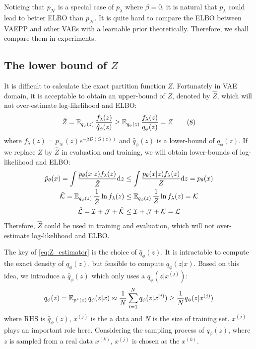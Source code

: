 Noticing that $p_\mathcal{N}$ is a special case of $p_\lambda$ where $\beta = 0$, it is natural that $p_\lambda$ could lead to better ELBO than $p_\mathcal{N}$. It is quite hard to compare the ELBO between VAEPP and other VAEs with a learnable prior theoretically. Therefore, we shall compare them in experiments.  

\subsection{The lower bound of $Z$}\label{subsec:determine_z}

It is difficult to calculate the exact partition function $Z$. Fortunately in VAE domain, it is acceptable to obtain an upper-bound of $Z$, denoted by $\hat{Z}$, which will not over-estimate log-likelihood and ELBO:
\begin{align*}\label{eq:Z_estimator}
    \hat{Z} = \operatorname{\mathbb{E}}_{q_\phi(z)} \frac{f_\lambda(z)}{\hat{q}_\phi(z)} \geq
	\operatorname{\mathbb{E}}_{q_\phi(z)}\frac{f_\lambda(z)}{q_\phi(z)} = Z \tag{8}
\end{align*}
where $f_\lambda(z) = p_\mathcal{N}(z) e^{- \beta D(G(z))}$ and $\hat{q}_\phi(z)$ is a lower-bound of $q_\phi(z)$. If we replace $Z$ by $\hat{Z}$ in evaluation and training, we will obtain lower-bounds of log-likelihood and ELBO:
\begin{align*}
	\hat{p}_\theta(x) = \int \frac{p_\theta(x|z) f_\lambda(z)}{\hat{Z}}  \mathrm{d} z &\leq \int \frac{p_\theta(x|z) f_\lambda(z)}{Z} \mathrm{d} z = p_\theta(x)  \\
	\mathcal{\hat{K}} = \operatorname{\mathbb{E}}_{q_\phi(z)} \frac{1}{\hat{Z}}\ln f_\lambda(z) &\leq \operatorname{\mathbb{E}}_{q_\phi(z)} \frac{1}{Z} \ln f_\lambda(z) = \mathcal{K}   \\
    \mathcal{\hat{L}} =  \mathcal{I} + \mathcal{J} + \mathcal{\hat{K}} &\leq \mathcal{I} + \mathcal{J} + \mathcal{K} = \mathcal{L}
\end{align*}
Therefore, $\hat{Z}$ could be used in training and evaluation, which will not over-estimate log-likelihood and ELBO. 

The key of \cref{eq:Z_estimator} is the choice of $\hat{q}_\phi(z)$. It is intractable to compute the exact density of $q_\phi(z)$, but feasible to compute $q_\phi(z|x)$. Based on this idea, we introduce a $\hat{q}_\phi(z)$ which only uses a $q_\phi(z|x^{(j)})$:
\begin{equation*}
	q_\phi(z) = \operatorname{\mathbb{E}}_{p^*(x)} q_\phi(z|x) \approx \frac{1}{N}\sum_{i=1}^N q_\phi(z|x^{(i)}) \geq \frac{1}{N} q_\phi(z|x^{(j)})
\end{equation*}
where RHS is $\hat{q}_\phi(z)$, $x^{(j)}$ is the a data and $N$ is the size of training set. $x^{(j)}$ plays an important role here. Considering the sampling process of $q_\phi(z)$, where $z$ is sampled from a real data $x^{(k)}$, $x^{(j)}$ is chosen as the $x^{(k)}$. 

